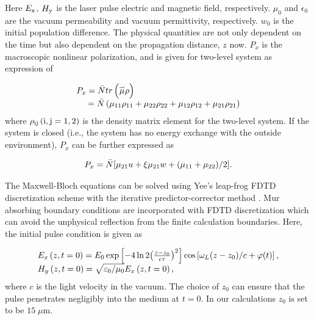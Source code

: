 \documentclass[10pt,letterpaper]{article}
\begin{document}
Here $ E_{\rm{x}} $, $ H_{\rm{y}} $ is the laser pulse electric and magnetic field, respectively. $\mu_{0}$ and $ \epsilon_{0} $ are the vacuum permeability and vacuum permittivity, respectively. $w_0$ is the initial population difference. The physical quantities are not only dependent on the time but also dependent on the propagation distance, $ z $ now. $ P_{x} $ is the macroscopic nonlinear polarization, and is given for two-level system as expression of \cite{Pan-Ruiqin-Permanent-dipole-moment-2011}

\begin{equation}
\begin{array}{l}
{P_x} =   \bar{N}tr\left( {\mathord{\buildrel{\lower3pt\hbox{$\scriptscriptstyle\rightharpoonup$}}
		\over \mu } \rho } \right)\\
\;\;\;\;\: =   \bar{N}\left( {{\mu _{11}}{\rho _{11}} + {\mu _{22}}{\rho _{22}} + {\mu _{12}}{\rho _{12}} + {\mu _{21}}{\rho _{21}}} \right)
\end{array}
\label{eq9}
\end{equation}
where ${\rho _{\rm{ij}}}\left( {\rm{i,j} = 1, 2} \right)$  is the density matrix element for the two-level system. If the system is closed (i.e., the system has no energy exchange with the outside environment),  $ P_{x} $ can be further expressed as

\begin{equation}
{P_x} =   \bar{N}[{\mu _{21}}u + \xi {\mu _{21}}w + {{\left( {{\mu _{11}} + {\mu _{22}}} \right)} \mathord{\left/
		{\vphantom {{N\left( {{\mu _{11}} + {\mu _{22}}} \right)} 2}} \right.
		\kern-\nulldelimiterspace} 2}].
\label{eq10}
\end{equation}

The Maxwell-Bloch equations can be solved using Yee's leap-frog FDTD discretization scheme \cite{Yee} with the iterative predictor-corrector method \cite{Ziolkowski-Two-Level-Method-PRA-1995}. Mur absorbing boundary conditions \cite{Mur-Absorption} are incorporated with FDTD discretization which can avoid the unphysical reflection from the finite calculation boundaries. Here, the initial pulse condition is given as

\begin{equation}
\begin{array}{l}
{E_x}\left( {z,t = 0} \right) = {E_0}\exp \left[ { - 4\ln 2{{\left( {\frac{{z - {z_0}}}{{c\tau }}} \right)}^2}} \right]\cos \left[ {{\omega _L}{{\left( {z - {z_0}} \right)} \mathord{\left/
			{\vphantom {{\left( {z - {z_0}} \right)} c}} \right.
			\kern-\nulldelimiterspace} c}}  + \varphi (t)\right],\\
{H_y}\left( {z,t = 0} \right) = \sqrt {{{{\varepsilon _0}} \mathord{\left/
			{\vphantom {{{\varepsilon _0}} {{\mu _0}}}} \right.
			\kern-\nulldelimiterspace} {{\mu _0}}}} {E_x}\left( {z,t = 0} \right),
\end{array}
\label{eq11}
\end{equation}
where $ c $ is the light velocity in the vacuum. The choice of $ z_{0} $ can ensure that the pulse penetrates negligibly into the medium at $ t=0 $. In our calculations $ z_{0} $ is set to be $15\;\mu$m.
\end{document}

